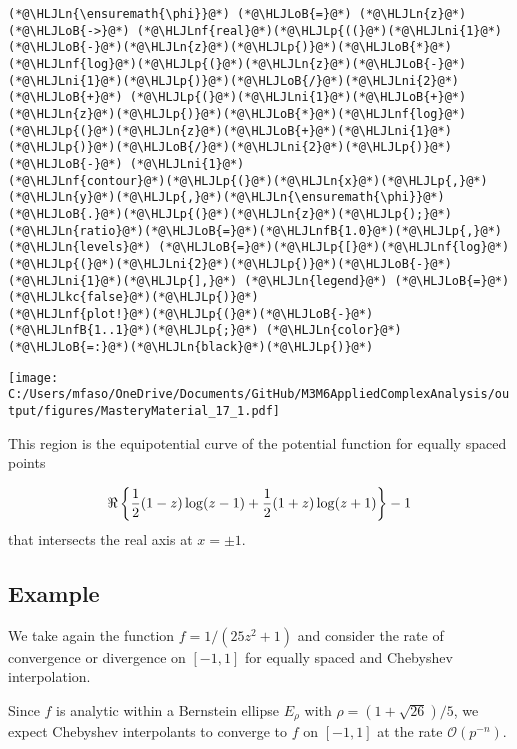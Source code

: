\documentclass[12pt,a4paper]{article}
\newcommand{\HLJLkc}[1]{\textcolor[RGB]{59,151,46}{\textit{#1}}}
\newcommand{\HLJLn}[1]{#1}
\newcommand{\HLJLnf}[1]{\textcolor[RGB]{66,102,213}{#1}}
\newcommand{\HLJLnfB}[1]{\textcolor[RGB]{59,151,46}{#1}}
\newcommand{\HLJLni}[1]{\textcolor[RGB]{59,151,46}{#1}}
\newcommand{\HLJLoB}[1]{\textcolor[RGB]{102,102,102}{\textbf{#1}}}
\newcommand{\HLJLp}[1]{#1}
\begin{document}
\begin{lstlisting}
(*@\HLJLn{\ensuremath{\phi}}@*) (*@\HLJLoB{=}@*) (*@\HLJLn{z}@*) (*@\HLJLoB{->}@*) (*@\HLJLnf{real}@*)(*@\HLJLp{((}@*)(*@\HLJLni{1}@*)(*@\HLJLoB{-}@*)(*@\HLJLn{z}@*)(*@\HLJLp{)}@*)(*@\HLJLoB{*}@*)(*@\HLJLnf{log}@*)(*@\HLJLp{(}@*)(*@\HLJLn{z}@*)(*@\HLJLoB{-}@*)(*@\HLJLni{1}@*)(*@\HLJLp{)}@*)(*@\HLJLoB{/}@*)(*@\HLJLni{2}@*) (*@\HLJLoB{+}@*) (*@\HLJLp{(}@*)(*@\HLJLni{1}@*)(*@\HLJLoB{+}@*)(*@\HLJLn{z}@*)(*@\HLJLp{)}@*)(*@\HLJLoB{*}@*)(*@\HLJLnf{log}@*)(*@\HLJLp{(}@*)(*@\HLJLn{z}@*)(*@\HLJLoB{+}@*)(*@\HLJLni{1}@*)(*@\HLJLp{)}@*)(*@\HLJLoB{/}@*)(*@\HLJLni{2}@*)(*@\HLJLp{)}@*) (*@\HLJLoB{-}@*) (*@\HLJLni{1}@*)
(*@\HLJLnf{contour}@*)(*@\HLJLp{(}@*)(*@\HLJLn{x}@*)(*@\HLJLp{,}@*)(*@\HLJLn{y}@*)(*@\HLJLp{,}@*)(*@\HLJLn{\ensuremath{\phi}}@*)(*@\HLJLoB{.}@*)(*@\HLJLp{(}@*)(*@\HLJLn{z}@*)(*@\HLJLp{);}@*)(*@\HLJLn{ratio}@*)(*@\HLJLoB{=}@*)(*@\HLJLnfB{1.0}@*)(*@\HLJLp{,}@*) (*@\HLJLn{levels}@*) (*@\HLJLoB{=}@*)(*@\HLJLp{[}@*)(*@\HLJLnf{log}@*)(*@\HLJLp{(}@*)(*@\HLJLni{2}@*)(*@\HLJLp{)}@*)(*@\HLJLoB{-}@*)(*@\HLJLni{1}@*)(*@\HLJLp{],}@*) (*@\HLJLn{legend}@*) (*@\HLJLoB{=}@*) (*@\HLJLkc{false}@*)(*@\HLJLp{)}@*)
(*@\HLJLnf{plot!}@*)(*@\HLJLp{(}@*)(*@\HLJLoB{-}@*)(*@\HLJLnfB{1..1}@*)(*@\HLJLp{;}@*) (*@\HLJLn{color}@*)(*@\HLJLoB{=:}@*)(*@\HLJLn{black}@*)(*@\HLJLp{)}@*)
\end{lstlisting}

\texttt{[image: C:/Users/mfaso/OneDrive/Documents/GitHub/M3M6AppliedComplexAnalysis/output/figures/MasteryMaterial\_17\_1.pdf]}

This region is the equipotential curve of the potential function for equally spaced points

\[
\Re \left\lbrace {1\over 2}(1-z) \log(z-1) + {1\over 2}(1+z) \log(z+1) \right\rbrace  -1
\]
that intersects the real axis at $x = \pm 1$.

\subsection{Example}
We take again the function $f = 1/(25z^2 + 1)$ and consider the rate of convergence or divergence on $[-1, 1]$ for equally spaced and Chebyshev interpolation.

Since $f$ is analytic within a Bernstein ellipse $E_{\rho}$ with $\rho = (1 + \sqrt{26})/5$, we expect Chebyshev interpolants to converge to $f$ on $[-1, 1]$ at the rate $\mathcal{O}(p^{-n})$.
\end{document}
